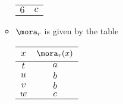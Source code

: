 \begin{gradedexercise}
\begin{enumerate}
\begin{itemize}
\begin{center}
\begin{tabular}{c|c}
                                $6$ & $c$
                            \end{tabular}
                        \end{center}
                  \item $\mora_r$ is given by the table
                        \begin{center}
                            \begin{tabular}{c|c}
                                $x$ & $\mora_r(x)$ \\
                                \hline
                                $t$ & $a$ \\
                                $u$ & $b$ \\
                                $v$ & $b$ \\
                                $w$ & $c$
                            \end{tabular}
                        \end{center}
              \end{itemize}
    \end{enumerate}

\end{gradedexercise}

